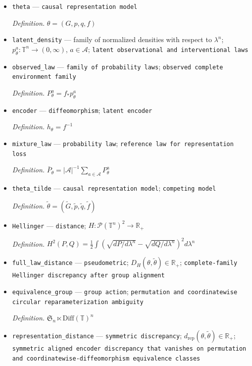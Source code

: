 \documentclass{article}
\begin{document}
\begin{itemize}
  \item \texttt{theta} --- \texttt{causal representation model}
  \par\smallskip\noindent\emph{Definition.} \(\theta=(G,p,q,f)\)
  \item \texttt{latent\_\allowbreak{}density} --- family of normalized densities with respect to \(\lambda^n\); \(p_\theta^a:\mathbb T^n\to(0,\infty)\), \(a\in\mathcal A\); \texttt{latent observational and interventional laws}
  \item \texttt{observed\_\allowbreak{}law} --- \texttt{family of probability laws}; \texttt{observed complete environment family}
  \par\smallskip\noindent\emph{Definition.} \(P_\theta^a=f_*p_\theta^a\)
  \item \texttt{encoder} --- \texttt{diffeomorphism}; \texttt{latent encoder}
  \par\smallskip\noindent\emph{Definition.} \(h_\theta=f^{-1}\)
  \item \texttt{mixture\_\allowbreak{}law} --- \texttt{probability law}; \texttt{reference law for representation loss}
  \par\smallskip\noindent\emph{Definition.} \(\bar P_\theta=|\mathcal A|^{-1}\sum_{a\in\mathcal A}P_\theta^a\)
  \item \texttt{theta\_\allowbreak{}tilde} --- \texttt{causal representation model}; \texttt{competing model}
  \par\smallskip\noindent\emph{Definition.} \(\widetilde\theta=(\widetilde G,\widetilde p,\widetilde q,\widetilde f)\)
  \item \texttt{Hellinger} --- \texttt{distance}; \(H:\mathcal P(\mathbb T^n)^2\to\mathbb R_+\)
  \par\smallskip\noindent\emph{Definition.} \(H^2(P,Q)=\frac12\int(\sqrt{dP/d\lambda^n}-\sqrt{dQ/d\lambda^n})^2d\lambda^n\)
  \item \texttt{full\_\allowbreak{}law\_\allowbreak{}distance} --- \texttt{pseudometric}; \(D_H(\theta,\widetilde\theta)\in\mathbb R_+\); \texttt{complete-\allowbreak{}family Hellinger discrepancy after group alignment}
  \item \texttt{equivalence\_\allowbreak{}group} --- \texttt{group action}; \texttt{permutation and coordinatewise circular reparameterization ambiguity}
  \par\smallskip\noindent\emph{Definition.} \(\mathfrak S_n\ltimes\mathrm{Diff}(\mathbb T)^n\)
  \item \texttt{representation\_\allowbreak{}distance} --- \texttt{symmetric discrepancy}; \(d_{\mathrm{rep}}(\theta,\widetilde\theta)\in\mathbb R_+\); \texttt{symmetric aligned encoder discrepancy that vanishes on permutation and coordinatewise-\allowbreak{}diffeomorphism equivalence classes}

\end{itemize}
\end{document}
